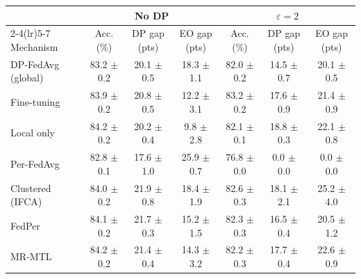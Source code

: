 \begin{tabular}{lcccccc}
\toprule
 & \multicolumn{3}{c}{No DP} & \multicolumn{3}{c}{$\varepsilon=2$} \\
\cmidrule(lr){2-4}\cmidrule(lr){5-7}
Mechanism & Acc. (\%) & DP gap (pts) & EO gap (pts) & Acc. (\%) & DP gap (pts) & EO gap (pts) \\
\midrule
DP-FedAvg (global) & 83.2 $\pm$ 0.2 & 20.1 $\pm$ 0.5 & 18.3 $\pm$ 1.1 & 82.0 $\pm$ 0.2 & 14.5 $\pm$ 0.7 & 20.1 $\pm$ 0.5 \\
Fine-tuning & 83.9 $\pm$ 0.2 & 20.8 $\pm$ 0.5 & 12.2 $\pm$ 3.1 & 83.2 $\pm$ 0.2 & 17.6 $\pm$ 0.9 & 21.4 $\pm$ 0.9 \\
Local only & 84.2 $\pm$ 0.2 & 20.2 $\pm$ 0.4 & 9.8 $\pm$ 2.8 & 82.1 $\pm$ 0.1 & 18.8 $\pm$ 0.3 & 22.1 $\pm$ 0.8 \\
Per-FedAvg & 82.8 $\pm$ 0.1 & 17.6 $\pm$ 1.0 & 25.9 $\pm$ 0.7 & 76.8 $\pm$ 0.0 & 0.0 $\pm$ 0.0 & 0.0 $\pm$ 0.0 \\
Clustered (IFCA) & 84.0 $\pm$ 0.2 & 21.9 $\pm$ 0.8 & 18.4 $\pm$ 1.9 & 82.6 $\pm$ 0.3 & 18.1 $\pm$ 2.1 & 25.2 $\pm$ 4.0 \\
FedPer & 84.1 $\pm$ 0.2 & 21.7 $\pm$ 0.3 & 15.2 $\pm$ 1.5 & 82.3 $\pm$ 0.3 & 16.5 $\pm$ 0.4 & 20.5 $\pm$ 1.2 \\
MR-MTL & 84.2 $\pm$ 0.2 & 21.4 $\pm$ 0.4 & 14.3 $\pm$ 3.2 & 82.2 $\pm$ 0.3 & 17.7 $\pm$ 0.4 & 22.6 $\pm$ 0.9 \\
\bottomrule
\end{tabular}
